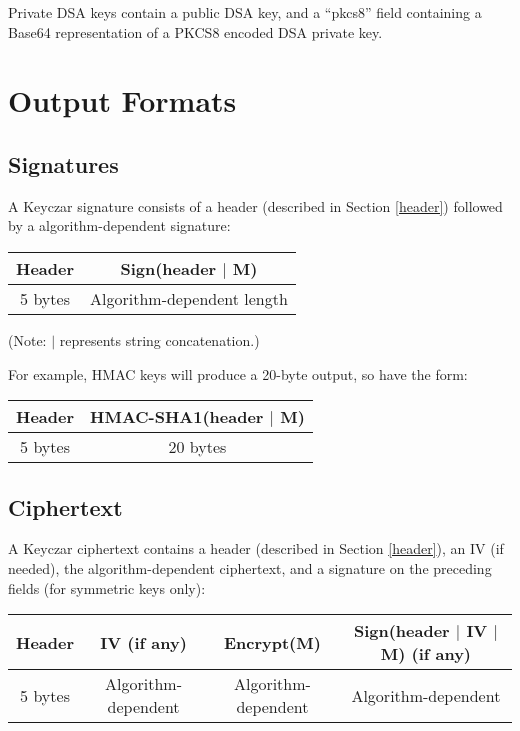 \documentclass{llncs}
\begin{document}
Private DSA keys contain a public DSA key, and a ``pkcs8'' field containing a
Base64 representation of a PKCS8 encoded DSA private key. 

\section{Output Formats}

\subsection{Signatures}\label{signatures}

A Keyczar signature consists of a header (described in Section \ref{header})
followed by a algorithm-dependent signature:

\vspace*{3mm}
\begin{tabular}{| c | c |}
\hline
Header & Sign(header $|$ M) \\
\hline 5 bytes & Algorithm-dependent length \\ \hline
\end{tabular}
\vspace*{3mm}

(Note: $|$ represents string concatenation.)

\vspace*{3mm}

For example, HMAC keys will produce a 20-byte output, so have the form:

\vspace*{3mm}
\begin{tabular}{| c | c |}
\hline
Header & HMAC-SHA1(header $|$ M) \\ \hline
5 bytes & 20 bytes \\ \hline
\end{tabular}
\vspace*{3mm}
\subsection{Ciphertext}

A Keyczar ciphertext contains a header (described in Section \ref{header}), an
IV (if needed), the algorithm-dependent ciphertext, and a signature on the
preceding fields (for symmetric keys only):

\vspace*{3mm}
\begin{tabular}{| c | c | c | c |}
\hline
Header & IV (if any) & Encrypt(M) & Sign(header $|$ IV $|$ M) (if any) \\ \hline
5 bytes & Algorithm-dependent & Algorithm-dependent & Algorithm-dependent \\
\hline
\end{tabular}
\vspace*{3mm}
\end{document}
